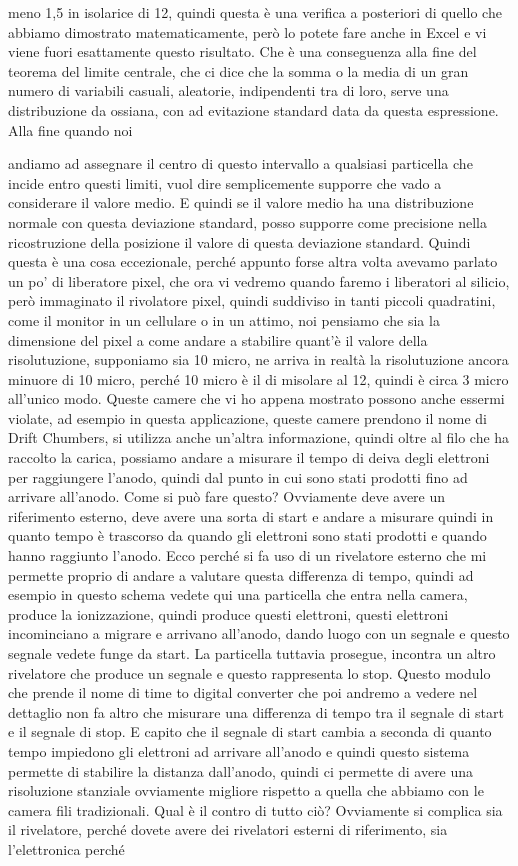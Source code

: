 meno 1,5 in isolarice di 12, quindi questa è una verifica a posteriori di quello che abbiamo dimostrato matematicamente, però lo potete fare anche in Excel e vi viene fuori esattamente questo risultato. Che è una conseguenza alla fine del teorema del limite centrale, che ci dice che la somma o la media di un gran numero di variabili casuali, aleatorie, indipendenti tra di loro, serve una distribuzione da ossiana, con ad evitazione standard data da questa espressione. Alla fine quando noi 

andiamo ad assegnare il centro di questo intervallo a qualsiasi particella che incide entro questi limiti, vuol dire semplicemente supporre che vado a considerare il valore medio. E quindi se il valore medio ha una distribuzione normale con questa deviazione standard, posso supporre come precisione nella ricostruzione della posizione il valore di questa deviazione standard. Quindi questa è una cosa eccezionale, perché appunto forse altra volta avevamo parlato un po' di liberatore pixel, che ora vi vedremo quando faremo i liberatori al silicio, però immaginato il rivolatore pixel, quindi suddiviso in tanti piccoli quadratini, come il monitor in un cellulare o in un attimo, noi pensiamo che sia la dimensione del pixel a come andare a stabilire quant'è il valore della risolutuzione, supponiamo sia 10 micro, ne arriva in realtà la risolutuzione ancora minuore di 10 micro, perché 10 micro è il di misolare al 12, quindi è circa 3 micro all'unico modo. Queste camere che vi ho appena mostrato possono anche essermi violate, ad esempio in questa applicazione, queste camere prendono il nome di Drift Chumbers, si utilizza anche un'altra informazione, quindi oltre al filo che ha raccolto la carica, possiamo andare a misurare il tempo di deiva degli elettroni per raggiungere l'anodo, quindi dal punto in cui sono stati prodotti fino ad arrivare all'anodo. Come si può fare questo? Ovviamente deve avere un riferimento esterno, deve avere una sorta di start e andare a misurare quindi in quanto tempo è trascorso da quando gli elettroni sono stati prodotti e quando hanno raggiunto l'anodo. Ecco perché si fa uso di un rivelatore esterno che mi permette proprio di andare a valutare questa differenza di tempo, quindi ad esempio in questo schema vedete qui una particella che entra nella camera, produce la ionizzazione, quindi produce questi elettroni, questi elettroni incominciano a migrare e arrivano all'anodo, dando luogo con un segnale e questo segnale vedete funge da start. La particella tuttavia prosegue, incontra un altro rivelatore che produce un segnale e questo rappresenta lo stop. Questo modulo che prende il nome di time to digital converter che poi andremo a vedere nel dettaglio non fa altro che misurare una differenza di tempo tra il segnale di start e il segnale di stop. E capito che il segnale di start cambia a seconda di quanto tempo impiedono gli elettroni ad arrivare all'anodo e quindi questo sistema permette di stabilire la distanza dall'anodo, quindi ci permette di avere una risoluzione stanziale ovviamente migliore rispetto a quella che abbiamo con le camera fili tradizionali. Qual è il contro di tutto ciò? Ovviamente si complica sia il rivelatore, perché dovete avere dei rivelatori esterni di riferimento, sia l'elettronica perché 
